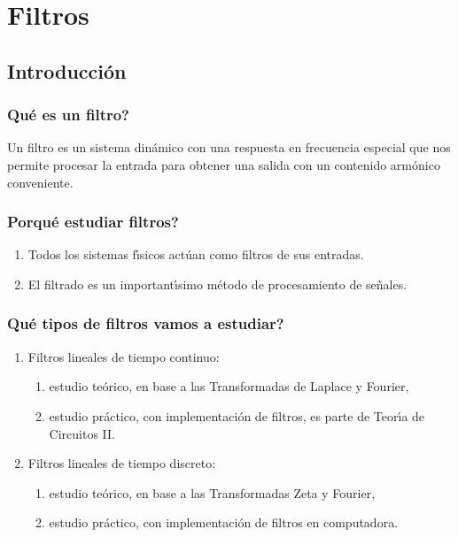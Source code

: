 \chapter{Filtros}

\section{Introducci\'{o}n}

\subsection{\textquestiondown Qu\'{e} es un filtro?}

Un filtro es un sistema din\'{a}mico con una respuesta en frecuencia especial que nos permite 
procesar la entrada para obtener una salida con un contenido arm\'{o}nico conveniente.

\subsection{\textquestiondown Porqu\'{e} estudiar filtros?}

\begin{enumerate} 
\item   Todos los sistemas f\'{\i}sicos act\'{u}an como filtros de sus entradas.
        
\item   El filtrado es un important\'{\i}simo m\'{e}todo de procesamiento de se\~{n}ales.
\end{enumerate}

\subsection{\textquestiondown Qu\'{e} tipos de filtros vamos a estudiar?}

\begin{enumerate}
\item   Filtros lineales de tiempo continuo:
  \begin{enumerate}
  \item   estudio te\'{o}rico, en base a las Transformadas de Laplace y Fourier,
    
  \item   estudio pr\'{a}ctico, con implementaci\'{o}n de filtros, es parte de Teor\'{\i}a de Circuitos II.
  \end{enumerate}
        
\item   Filtros lineales de tiempo discreto: 
  \begin{enumerate}
  \item   estudio te\'{o}rico, en base a las Transformadas Zeta y Fourier,
    
  \item   estudio pr\'{a}ctico, con implementaci\'{o}n de filtros en computadora.
  \end{enumerate}
\end{enumerate}

